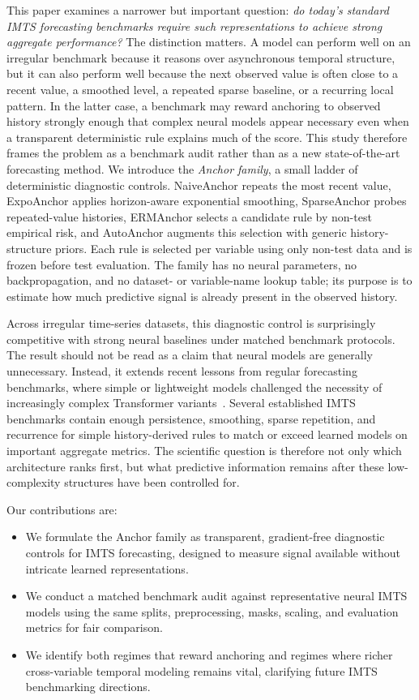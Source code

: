 \documentclass{article}
\begin{document}
This paper examines a narrower but important question: \emph{do today's standard
IMTS forecasting benchmarks require such representations to achieve strong
aggregate performance?} The distinction matters. A model can perform well on an
irregular benchmark because it reasons over asynchronous temporal structure, but
it can also perform well because the next observed value is often close to a
recent value, a smoothed level, a repeated sparse baseline, or a recurring local
pattern. In the latter case, a benchmark may reward anchoring to observed
history strongly enough that complex neural models appear necessary even when a
transparent deterministic rule explains much of the score. This study therefore frames the problem as a benchmark audit rather than as a new
state-of-the-art forecasting method. We introduce the \emph{Anchor family}, a
small ladder of deterministic diagnostic controls. NaiveAnchor repeats the most
recent value, ExpoAnchor applies horizon-aware exponential smoothing,
SparseAnchor probes repeated-value histories, ERMAnchor selects a candidate rule
by non-test empirical risk, and AutoAnchor augments this selection with generic
history-structure priors. Each rule is selected per variable using only
non-test data and is frozen before test evaluation. The family has no neural
parameters, no backpropagation, and no dataset- or variable-name lookup table;
its purpose is to estimate how much predictive signal is already present in the
observed history.

Across irregular time-series datasets, this diagnostic
control is surprisingly competitive with strong neural baselines under matched
benchmark protocols. The result should not be read as a claim that neural models
are generally unnecessary. Instead, it extends recent lessons from regular
forecasting benchmarks, where simple or lightweight models challenged the
necessity of increasingly complex Transformer variants~\citep{Zeng2023LTSFLinear,TFB2024,SimpleTM2025}.
Several established IMTS benchmarks contain enough persistence, smoothing,
sparse repetition, and recurrence for simple history-derived rules to match or
exceed learned models on important aggregate metrics. The scientific question is
therefore not only which architecture ranks first, but what predictive
information remains after these low-complexity structures have been controlled
for.

Our contributions are:
\begin{itemize}
    \item We formulate the Anchor family as transparent, gradient-free
    diagnostic controls for IMTS forecasting, designed to measure signal
    available without intricate learned representations.
    \item We conduct a matched benchmark audit against representative neural
    IMTS models using the same splits, preprocessing, masks, scaling, and
    evaluation metrics for fair comparison.
    \item We identify both regimes that reward anchoring and regimes where
    richer cross-variable temporal modeling remains vital, clarifying future IMTS benchmarking directions.
\end{itemize}
\end{document}
